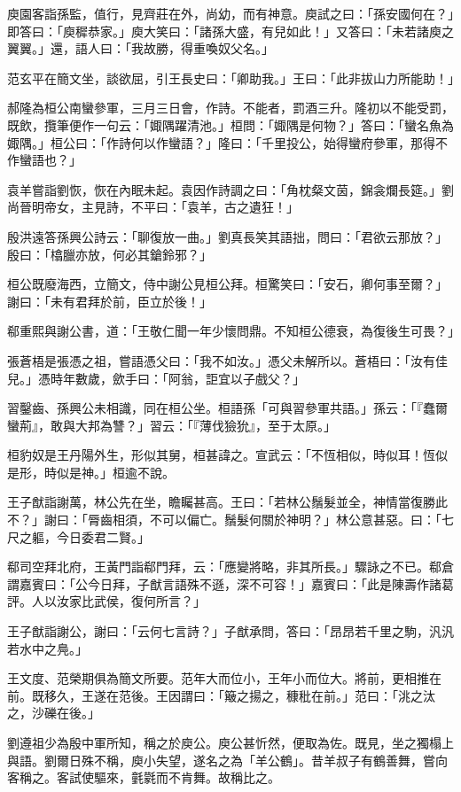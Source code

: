 庾園客詣孫監，值行，見齊莊在外，尚幼，而有神意。庾試之曰：「孫安國何在？」即答曰：「庾穉恭家。」庾大笑曰：「諸孫大盛，有兒如此！」又答曰：「未若諸庾之翼翼。」還，語人曰：「我故勝，得重喚奴父名。」

范玄平在簡文坐，談欲屈，引王長史曰：「卿助我。」王曰：「此非拔山力所能助！」

郝隆為桓公南蠻參軍，三月三日會，作詩。不能者，罰酒三升。隆初以不能受罰，既飲，攬筆便作一句云：「娵隅躍清池。」桓問：「娵隅是何物？」答曰：「蠻名魚為娵隅。」桓公曰：「作詩何以作蠻語？」隆曰：「千里投公，始得蠻府參軍，那得不作蠻語也？」

袁羊嘗詣劉恢，恢在內眠未起。袁因作詩調之曰：「角枕粲文茵，錦衾爛長筵。」劉尚晉明帝女，主見詩，不平曰：「袁羊，古之遺狂！」

殷洪遠答孫興公詩云：「聊復放一曲。」劉真長笑其語拙，問曰：「君欲云那放？」殷曰：「㯓臘亦放，何必其鎗鈴邪？」

桓公既廢海西，立簡文，侍中謝公見桓公拜。桓驚笑曰：「安石，卿何事至爾？」謝曰：「未有君拜於前，臣立於後！」

郗重熙與謝公書，道：「王敬仁聞一年少懷問鼎。不知桓公德衰，為復後生可畏？」

張蒼梧是張憑之祖，嘗語憑父曰：「我不如汝。」憑父未解所以。蒼梧曰：「汝有佳兒。」憑時年數歲，歛手曰：「阿翁，詎宜以子戲父？」

習鑿齒、孫興公未相識，同在桓公坐。桓語孫「可與習參軍共語。」孫云：「『蠢爾蠻荊』，敢與大邦為讐？」習云：「『薄伐獫狁』，至于太原。」

桓豹奴是王丹陽外生，形似其舅，桓甚諱之。宣武云：「不恆相似，時似耳！恆似是形，時似是神。」桓逾不說。

王子猷詣謝萬，林公先在坐，瞻矚甚高。王曰：「若林公鬚髮並全，神情當復勝此不？」謝曰：「脣齒相須，不可以偏亡。鬚髮何關於神明？」林公意甚惡。曰：「七尺之軀，今日委君二賢。」

郗司空拜北府，王黃門詣郗門拜，云：「應變將略，非其所長。」驟詠之不已。郗倉謂嘉賓曰：「公今日拜，子猷言語殊不遜，深不可容！」嘉賓曰：「此是陳壽作諸葛評。人以汝家比武侯，復何所言？」

王子猷詣謝公，謝曰：「云何七言詩？」子猷承問，答曰：「昂昂若千里之駒，汎汎若水中之鳧。」

王文度、范榮期俱為簡文所要。范年大而位小，王年小而位大。將前，更相推在前。既移久，王遂在范後。王因謂曰：「簸之揚之，穅秕在前。」范曰：「洮之汰之，沙礫在後。」

劉遵祖少為殷中軍所知，稱之於庾公。庾公甚忻然，便取為佐。既見，坐之獨榻上與語。劉爾日殊不稱，庾小失望，遂名之為「羊公鶴」。昔羊叔子有鶴善舞，嘗向客稱之。客試使驅來，氃氋而不肯舞。故稱比之。

